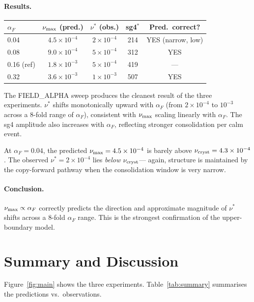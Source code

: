 \documentclass[11pt]{article}
\begin{document}
\paragraph{Results.}
\begin{center}
\begin{tabular}{lcccc}
\toprule
$\alpha_F$ & $\nu_{\rm max}$ (pred.) & $\nu^*$ (obs.) & sg4$^*$ & Pred.\ correct? \\
\midrule
0.04       & $4.5\times10^{-4}$ & $2\times10^{-4}$ & 214 & YES (narrow, low) \\
0.08       & $9.0\times10^{-4}$ & $5\times10^{-4}$ & 312 & YES \\
0.16 (ref) & $1.8\times10^{-3}$ & $5\times10^{-4}$ & 419 & --- \\
0.32       & $3.6\times10^{-3}$ & $1\times10^{-3}$ & 507 & YES \\
\bottomrule
\end{tabular}
\end{center}

The FIELD\_ALPHA sweep produces the cleanest result of the three experiments.
$\nu^*$ shifts monotonically upward with $\alpha_F$ (from $2\times10^{-4}$
to $10^{-3}$ across a 8-fold range of $\alpha_F$), consistent with $\nu_{\rm max}$
scaling linearly with $\alpha_F$.
The sg4 amplitude also increases with $\alpha_F$, reflecting stronger consolidation
per calm event.

At $\alpha_F = 0.04$, the predicted $\nu_{\rm max} = 4.5\times10^{-4}$ is barely
above $\nu_{\rm cryst} = 4.3\times10^{-4}$.
The observed $\nu^* = 2\times10^{-4}$ lies \emph{below} $\nu_{\rm cryst}$---
again, structure is maintained by the copy-forward pathway when the consolidation
window is very narrow.

\paragraph{Conclusion.}
$\nu_{\rm max} \propto \alpha_F$ correctly predicts the direction and approximate
magnitude of $\nu^*$ shifts across a 8-fold $\alpha_F$ range.
This is the strongest confirmation of the upper-boundary model.

\section{Summary and Discussion}

Figure~\ref{fig:main} shows the three experiments.
Table~\ref{tab:summary} summarises the predictions vs.\ observations.
\end{document}
